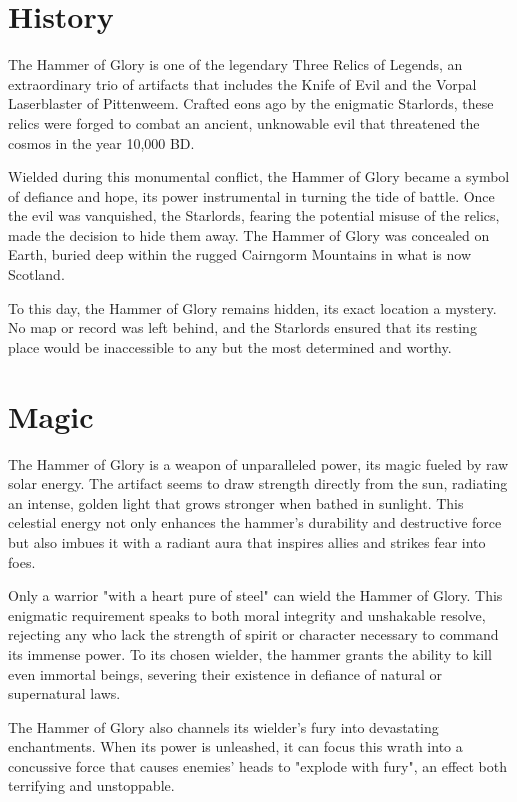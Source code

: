 \section*{History}
{\entryfont The Hammer of Glory is one of the legendary Three Relics of Legends, an extraordinary trio of artifacts that includes the Knife of Evil and the Vorpal Laserblaster of Pittenweem. Crafted eons ago by the enigmatic Starlords, these relics were forged to combat an ancient, unknowable evil that threatened the cosmos in the year 10,000 BD.

Wielded during this monumental conflict, the Hammer of Glory became a symbol of defiance and hope, its power instrumental in turning the tide of battle. Once the evil was vanquished, the Starlords, fearing the potential misuse of the relics, made the decision to hide them away. The Hammer of Glory was concealed on Earth, buried deep within the rugged Cairngorm Mountains in what is now Scotland.

To this day, the Hammer of Glory remains hidden, its exact location a mystery. No map or record was left behind, and the Starlords ensured that its resting place would be inaccessible to any but the most determined and worthy.}

\section*{Magic}
{\entryfont The Hammer of Glory is a weapon of unparalleled power, its magic fueled by raw solar energy. The artifact seems to draw strength directly from the sun, radiating an intense, golden light that grows stronger when bathed in sunlight. This celestial energy not only enhances the hammer's durability and destructive force but also imbues it with a radiant aura that inspires allies and strikes fear into foes.

Only a warrior "with a heart pure of steel" can wield the Hammer of Glory. This enigmatic requirement speaks to both moral integrity and unshakable resolve, rejecting any who lack the strength of spirit or character necessary to command its immense power. To its chosen wielder, the hammer grants the ability to kill even immortal beings, severing their existence in defiance of natural or supernatural laws.

The Hammer of Glory also channels its wielder's fury into devastating enchantments. When its power is unleashed, it can focus this wrath into a concussive force that causes enemies' heads to "explode with fury", an effect both terrifying and unstoppable.}

